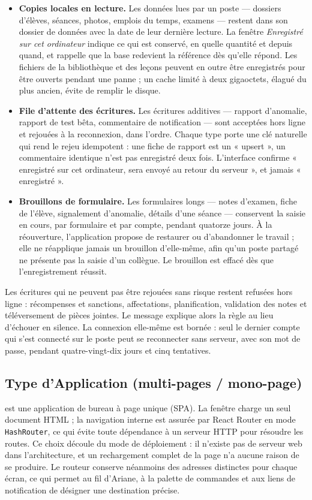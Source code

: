 \begin{itemize}
    \item \textbf{Copies locales en lecture.} Les données lues par un poste — dossiers d'élèves,
séances, photos, emplois du temps, examens — restent dans son dossier de données avec la date de leur
dernière lecture. La fenêtre \emph{Enregistré sur cet ordinateur} indique ce qui est conservé, en
quelle quantité et depuis quand, et rappelle que la base redevient la référence dès qu'elle répond.
Les fichiers de la bibliothèque et des leçons peuvent en outre être enregistrés pour être ouverts
pendant une panne ; un cache limité à deux gigaoctets, élagué du plus ancien, évite de remplir le
disque.
    \item \textbf{File d'attente des écritures.} Les écritures additives — rapport d'anomalie, rapport
de test bêta, commentaire de notification — sont acceptées hors ligne et rejouées à la reconnexion,
dans l'ordre. Chaque type porte une clé naturelle qui rend le rejeu idempotent : une fiche de rapport
est un « upsert », un commentaire identique n'est pas enregistré deux fois. L'interface confirme
« enregistré sur cet ordinateur, sera envoyé au retour du serveur », et jamais « enregistré ».
    \item \textbf{Brouillons de formulaire.} Les formulaires longs — notes d'examen, fiche de l'élève,
signalement d'anomalie, détails d'une séance — conservent la saisie en cours, par formulaire et par
compte, pendant quatorze jours. À la réouverture, l'application propose de restaurer ou d'abandonner
le travail ; elle ne réapplique jamais un brouillon d'elle-même, afin qu'un poste partagé ne présente
pas la saisie d'un collègue. Le brouillon est effacé dès que l'enregistrement réussit.
\end{itemize}

Les écritures qui ne peuvent pas être rejouées sans risque restent refusées hors ligne : récompenses et
sanctions, affectations, planification, validation des notes et téléversement de pièces jointes. Le
message explique alors la règle au lieu d'échouer en silence. La connexion elle-même est bornée : seul
le dernier compte qui s'est connecté sur le poste peut se reconnecter sans serveur, avec son mot de
passe, pendant quatre-vingt-dix jours et cinq tentatives.

\subsection{Type d'Application (multi-pages / mono-page)}
\appname{} est une application de bureau à page unique (\ac{SPA}). La fenêtre charge un seul document
\ac{HTML} ; la navigation interne est assurée par React Router en mode \texttt{HashRouter}, ce qui
évite toute dépendance à un serveur \ac{HTTP} pour résoudre les routes. Ce choix découle du mode de
déploiement : il n'existe pas de serveur web dans l'architecture, et un rechargement complet de la page
n'a aucune raison de se produire. Le routeur conserve néanmoins des adresses distinctes pour chaque
écran, ce qui permet au fil d'Ariane, à la palette de commandes et aux liens de notification de désigner
une destination précise.

